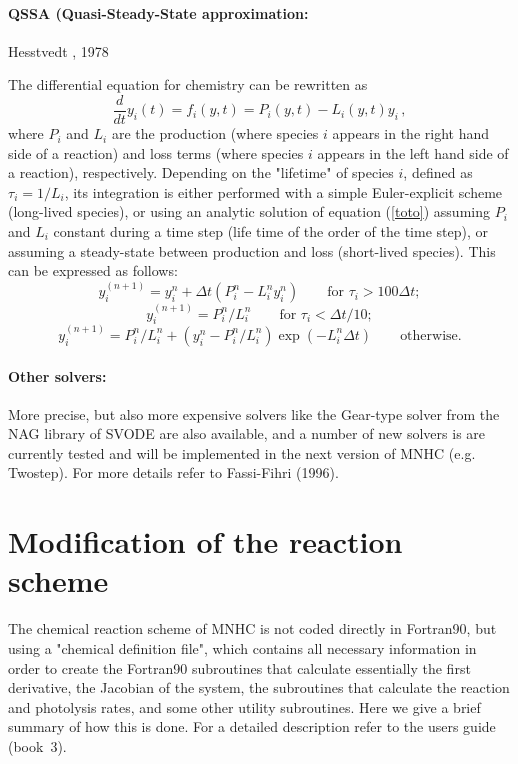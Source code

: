 \paragraph*{QSSA (Quasi-Steady-State approximation:} Hesstvedt \etal, 1978
\par\noindent
The differential equation for chemistry can be rewritten as
\begin{equation}
  \frac{d}{dt} y_i(t) = f_i (y,t) = P_i(y,t) - L_i(y,t) y_i
  \,,
  \label{toto}
\end{equation}
where $P_i$ and $L_i$ are the production 
(where species $i$ appears in the right hand side of a reaction)
and loss terms (where species $i$ appears in the left 
hand side of a reaction), respectively.
Depending on the "lifetime" of species $i$, defined as
$\tau_i = 1/L_i$, its integration is either performed with a
simple Euler-explicit scheme (long-lived species), or
using an analytic solution of equation (\ref{toto}) assuming
$P_i$ and $L_i$ constant during a time step (life time of the order of the
time step), or assuming a steady-state between production and loss
(short-lived species). This can be expressed as follows:
\begin{equation}
  y_i^{(n+1)} = y_i^n + \Delta t ( P_i^n - L_i^n y_i^n ) \qquad \mbox{for }
  \tau_i > 100 \Delta t;
\end{equation}
\begin{equation}
  y_i^{(n+1)} = P_i^n / L_i^n \qquad \mbox{for }
  \tau_i < \Delta t / 10;
\end{equation}
\begin{equation}
  y_i^{(n+1)} = P_i^n / L_i^n +(y_i^n- P_i^n / L_i^n) \exp(-L_i^n\Delta t)
  \qquad \mbox{otherwise.}
\end{equation}

\paragraph*{Other solvers:}
\par\noindent
More precise, but also more expensive solvers like the Gear-type solver
from the NAG library of SVODE are also available, 
and a number of new solvers is are currently tested and will be implemented
in the next version of MNHC (e.g. Twostep).
For more details refer to Fassi-Fihri (1996).
%
\section{Modification of the reaction scheme}
%
The chemical reaction scheme of MNHC is not coded directly in Fortran90,
but using a "chemical definition file", which contains all necessary
information in order to create the Fortran90 subroutines that calculate
essentially the first derivative, the Jacobian of the system,
the subroutines that calculate the reaction and photolysis rates,
and some other utility subroutines.
Here we give a brief summary of how this is done.
For a detailed description refer to the users guide (book~3).

